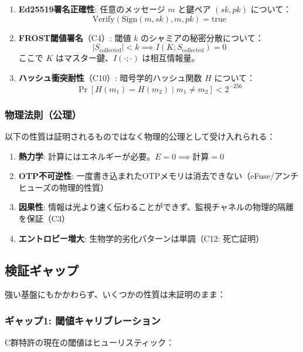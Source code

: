 \documentclass[11pt,a4paper]{article}
\begin{document}
\begin{enumerate}
    \item[(1)] \textbf{Ed25519署名正確性}: 任意のメッセージ $m$ と鍵ペア $(sk, pk)$ について：
    \[
    \text{Verify}(\text{Sign}(m, sk), m, pk) = \text{true}
    \]

    \item[(2)] \textbf{FROST閾値署名}（C4）: 閾値 $k$ のシャミアの秘密分散について：
    \[
    |S_{\text{collected}}| < k \implies I(K; S_{\text{collected}}) = 0
    \]
    ここで $K$ はマスター鍵、$I(\cdot;\cdot)$ は相互情報量。

    \item[(3)] \textbf{ハッシュ衝突耐性}（C10）: 暗号学的ハッシュ関数 $H$ について：
    \[
    \Pr[H(m_1) = H(m_2) \mid m_1 \neq m_2] < 2^{-256}
    \]
\end{enumerate}

\subsubsection{物理法則（公理）}

以下の性質は証明されるものではなく物理的公理として受け入れられる：

\begin{enumerate}
    \item[(1)] \textbf{熱力学}: 計算にはエネルギーが必要。$E = 0 \implies \text{計算} = 0$
    \item[(2)] \textbf{OTP不可逆性}: 一度書き込まれたOTPメモリは消去できない（eFuse/アンチヒューズの物理的性質）
    \item[(3)] \textbf{因果性}: 情報は光より速く伝わることができず、監視チャネルの物理的隔離を保証（C3）
    \item[(4)] \textbf{エントロピー増大}: 生物学的劣化パターンは単調（C12: 死亡証明）
\end{enumerate}

\subsection{検証ギャップ}

強い基盤にもかかわらず、いくつかの性質は未証明のまま：

\subsubsection{ギャップ1: 閾値キャリブレーション}

C群特許の現在の閾値はヒューリスティック：
\end{document}
